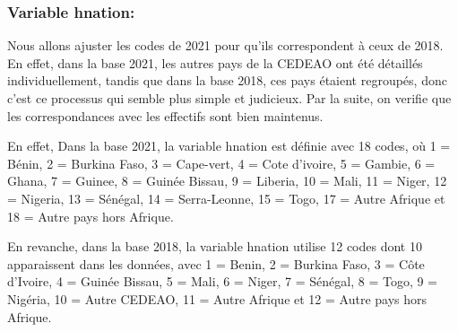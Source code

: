 \documentclass[
]{article}
\newenvironment{Shaded}{\begin{snugshade}}{\end{snugshade}}
\newcommand{\CommentTok}[1]{\textcolor[rgb]{0.56,0.35,0.01}{\textit{#1}}}
\newcommand{\FunctionTok}[1]{\textcolor[rgb]{0.13,0.29,0.53}{\textbf{#1}}}
\newcommand{\NormalTok}[1]{#1}
\newcommand{\OtherTok}[1]{\textcolor[rgb]{0.56,0.35,0.01}{#1}}
\newcommand{\SpecialCharTok}[1]{\textcolor[rgb]{0.81,0.36,0.00}{\textbf{#1}}}
\begin{document}
\hypertarget{variable-hnation}{%
\subsubsection{Variable hnation:}\label{variable-hnation}}

Nous allons ajuster les codes de 2021 pour qu'ils correspondent à ceux
de 2018. En effet, dans la base 2021, les autres pays de la CEDEAO ont
été détaillés individuellement, tandis que dans la base 2018, ces pays
étaient regroupés, donc c'est ce processus qui semble plus simple et
judicieux. Par la suite, on verifie que les correspondances avec les
effectifs sont bien maintenus.

En effet, Dans la base 2021, la variable hnation est définie avec 18
codes, où 1 = Bénin, 2 = Burkina Faso, 3 = Cape-vert, 4 = Cote d'ivoire,
5 = Gambie, 6 = Ghana, 7 = Guinee, 8 = Guinée Bissau, 9 = Liberia, 10 =
Mali, 11 = Niger, 12 = Nigeria, 13 = Sénégal, 14 = Serra-Leonne, 15 =
Togo, 17 = Autre Afrique et 18 = Autre pays hors Afrique.

En revanche, dans la base 2018, la variable hnation utilise 12 codes
dont 10 apparaissent dans les données, avec 1 = Benin, 2 = Burkina Faso,
3 = Côte d'Ivoire, 4 = Guinée Bissau, 5 = Mali, 6 = Niger, 7 = Sénégal,
8 = Togo, 9 = Nigéria, 10 = Autre CEDEAO, 11 = Autre Afrique et 12 =
Autre pays hors Afrique.

\begin{Shaded}
\end{Shaded}
\end{document}

